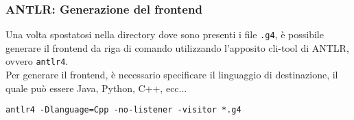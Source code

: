 \subsubsection{ANTLR: Generazione del frontend}
Una volta spostatosi nella directory dove sono presenti i file \texttt{.g4}, è possibile generare il frontend
da riga di comando utilizzando l'apposito cli-tool di ANTLR, ovvero \texttt{antlr4}. \\

Per generare il frontend, è necessario specificare il linguaggio di destinazione, 
il quale può essere Java, Python, C++, ecc...

\vspace{0.5cm}
\begin{lstlisting}[frame=single]
antlr4 -Dlanguage=Cpp -no-listener -visitor *.g4
\end{lstlisting}
\vspace{0.5cm}